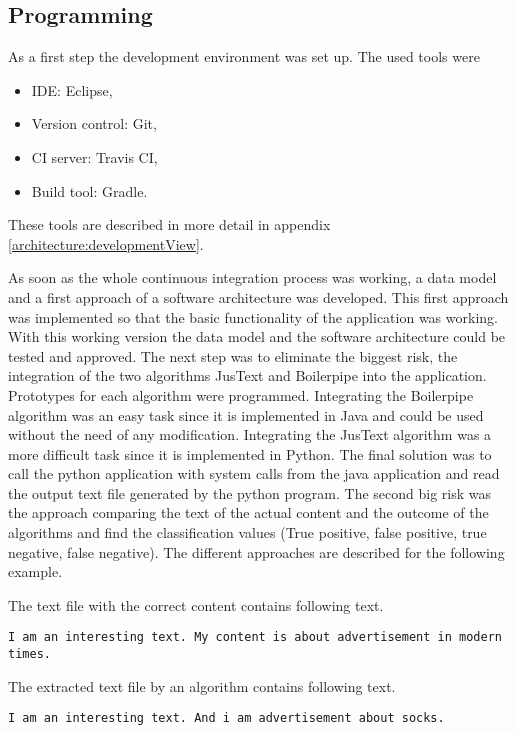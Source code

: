 \subsection{Programming}

As a first step the development environment was set up. The used tools were

\begin{itemize}
\item IDE: Eclipse, 
\item Version control: Git, 
\item CI server: Travis CI,
\item Build tool: Gradle.
\end{itemize}

These tools are described in more detail in appendix \ref{architecture:developmentView}. 

As soon as the whole continuous integration process was working, a data model and a first approach of a software architecture was developed. This first approach was implemented so that the basic functionality of the application was working. With this working version the data model and the software architecture could be tested and approved.
The next step was to eliminate the biggest risk, the integration of the two algorithms JusText and Boilerpipe into the application. Prototypes for each algorithm were programmed. Integrating the Boilerpipe algorithm \cite{algo:boilerpipe}  was an easy task since it is implemented in Java and could be used without the need of any modification. Integrating the JusText algorithm \cite{algo:justext} was a more difficult task since it is implemented in Python. The final solution was to call the python application with system calls from the java application and read the output text file generated by the python program. \linebreak
The second big risk was the approach comparing the text of the actual content and the outcome of the algorithms and find the classification values (True positive, false positive, true negative, false negative). The different approaches are described for the following example.


The text file with the correct content contains following text.


\texttt{I am an interesting text. My content is about advertisement in modern times.}

The extracted text file by an algorithm contains following text.

\texttt{I am an interesting text. And i am advertisement about socks. }

